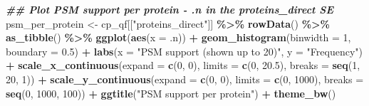 \documentclass[9pt,a4paper,]{extarticle}
\newenvironment{Shaded}{\begin{snugshade}}{\end{snugshade}}
\newcommand{\AttributeTok}[1]{\textcolor[rgb]{0.13,0.29,0.53}{#1}}
\newcommand{\DecValTok}[1]{\textcolor[rgb]{0.00,0.00,0.81}{#1}}
\newcommand{\DocumentationTok}[1]{\textcolor[rgb]{0.56,0.35,0.01}{\textbf{\textit{#1}}}}
\newcommand{\FloatTok}[1]{\textcolor[rgb]{0.00,0.00,0.81}{#1}}
\newcommand{\FunctionTok}[1]{\textcolor[rgb]{0.13,0.29,0.53}{\textbf{#1}}}
\newcommand{\NormalTok}[1]{#1}
\newcommand{\OtherTok}[1]{\textcolor[rgb]{0.56,0.35,0.01}{#1}}
\newcommand{\SpecialCharTok}[1]{\textcolor[rgb]{0.81,0.36,0.00}{\textbf{#1}}}
\newcommand{\StringTok}[1]{\textcolor[rgb]{0.31,0.60,0.02}{#1}}
\begin{document}
\begin{Shaded}
\begin{Highlighting}[]
\DocumentationTok{\#\# Plot PSM support per protein {-} .n in the proteins\_direct SE}
\NormalTok{psm\_per\_protein }\OtherTok{\textless{}{-}}\NormalTok{ cp\_qf[[}\StringTok{"proteins\_direct"}\NormalTok{]] }\SpecialCharTok{\%\textgreater{}\%}
  \FunctionTok{rowData}\NormalTok{() }\SpecialCharTok{\%\textgreater{}\%}
  \FunctionTok{as\_tibble}\NormalTok{() }\SpecialCharTok{\%\textgreater{}\%}
  \FunctionTok{ggplot}\NormalTok{(}\FunctionTok{aes}\NormalTok{(}\AttributeTok{x =}\NormalTok{ .n)) }\SpecialCharTok{+}
  \FunctionTok{geom\_histogram}\NormalTok{(}\AttributeTok{binwidth =} \DecValTok{1}\NormalTok{, }\AttributeTok{boundary =} \FloatTok{0.5}\NormalTok{) }\SpecialCharTok{+}
  \FunctionTok{labs}\NormalTok{(}\AttributeTok{x =} \StringTok{"PSM support (shown up to 20)"}\NormalTok{,}
       \AttributeTok{y =} \StringTok{"Frequency"}\NormalTok{) }\SpecialCharTok{+}
  \FunctionTok{scale\_x\_continuous}\NormalTok{(}\AttributeTok{expand =} \FunctionTok{c}\NormalTok{(}\DecValTok{0}\NormalTok{, }\DecValTok{0}\NormalTok{),}
                     \AttributeTok{limits =} \FunctionTok{c}\NormalTok{(}\DecValTok{0}\NormalTok{, }\FloatTok{20.5}\NormalTok{),}
                     \AttributeTok{breaks =} \FunctionTok{seq}\NormalTok{(}\DecValTok{1}\NormalTok{, }\DecValTok{20}\NormalTok{, }\DecValTok{1}\NormalTok{)) }\SpecialCharTok{+}
  \FunctionTok{scale\_y\_continuous}\NormalTok{(}\AttributeTok{expand =} \FunctionTok{c}\NormalTok{(}\DecValTok{0}\NormalTok{, }\DecValTok{0}\NormalTok{),}
                     \AttributeTok{limits =} \FunctionTok{c}\NormalTok{(}\DecValTok{0}\NormalTok{, }\DecValTok{1000}\NormalTok{),}
                     \AttributeTok{breaks =} \FunctionTok{seq}\NormalTok{(}\DecValTok{0}\NormalTok{, }\DecValTok{1000}\NormalTok{, }\DecValTok{100}\NormalTok{)) }\SpecialCharTok{+}
  \FunctionTok{ggtitle}\NormalTok{(}\StringTok{"PSM support per protein"}\NormalTok{) }\SpecialCharTok{+}
  \FunctionTok{theme\_bw}\NormalTok{()}


\end{Highlighting}
\end{Shaded}
\end{document}
